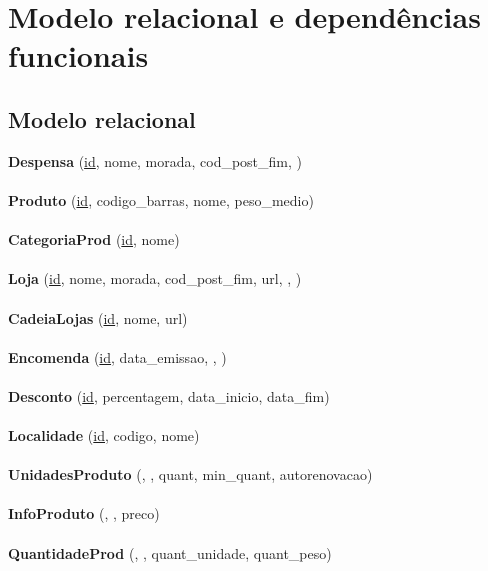 \documentclass{report}
\begin{document}
\chapter{Modelo relacional e dependências funcionais}
\section{Modelo relacional}
\textbf{Despensa} (\underline{id}, nome, morada, cod\_post\_fim,
)\\\\

\textbf{Produto} (\underline{id}, codigo\_barras, nome, peso\_medio)\\\\

\textbf{CategoriaProd} (\underline{id}, nome)\\\\

\textbf{Loja} (\underline{id}, nome, morada, cod\_post\_fim, url,
, )\\\\

\textbf{CadeiaLojas} (\underline{id}, nome, url)\\\\

\textbf{Encomenda} (\underline{id}, data\_emissao, ,
)\\\\

\textbf{Desconto} (\underline{id}, percentagem, data\_inicio, data\_fim)\\\\

\textbf{Localidade} (\underline{id}, codigo, nome)\\\\

\textbf{UnidadesProduto} (,
, quant, min\_quant, autorenovacao)\\\\

\textbf{InfoProduto} (,
, preco)\\\\

\textbf{QuantidadeProd} (,
, quant\_unidade, quant\_peso)\\\\
\end{document}
